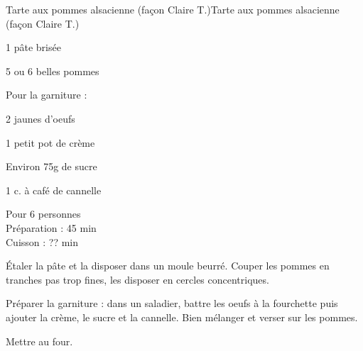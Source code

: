 \begin{recette}{Tarte aux pommes alsacienne (façon Claire T.)}{Tarte aux pommes alsacienne (façon Claire T.)}

\begin{ingredients}
1 pâte brisée\par
5 ou 6 belles pommes\par
Pour la garniture :\par
2 jaunes d'oeufs\par
1 petit pot de crème\par
Environ 75g de sucre\par
1 c. à café de cannelle\par
\end{ingredients}

\begin{infos}
Pour 6 personnes\\
Préparation : 45 min\\
Cuisson : ?? min\\
\end{infos}

\begin{etapes}
\item Étaler la pâte et la disposer dans un moule beurré. Couper les pommes en tranches pas trop fines, les disposer en cercles concentriques.
\item Préparer la garniture : dans un saladier, battre les oeufs à la fourchette puis ajouter la crème, le sucre et la cannelle. Bien mélanger et verser sur les pommes.
\item Mettre au four.
\end{etapes}

\end{recette}
